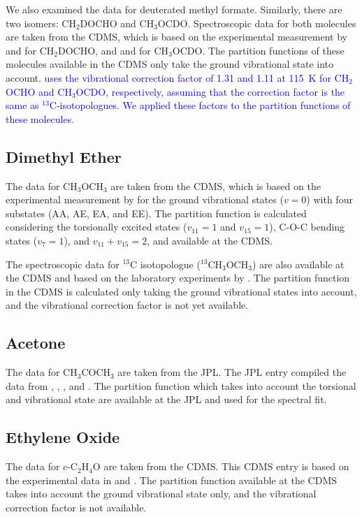 \documentclass[linenumbers, twocolumn, twocolappendix, astrosymb, times]{aastex631}
\newcommand{\dimethylether}{CH$_3$OCH$_3$\xspace}
\newcommand{\acetone}{CH$_3$COCH$_3$\xspace}
\newcommand{\ethyleneoxide}{$c$-C$_2$H$_4$O\xspace}
\begin{document}
We also examined the data for deuterated methyl formate. Similarly, there are two isomers: CH$_2$DOCHO and CH$_3$OCDO. Spectroscopic data for both molecules are taken from the CDMS, which is based on the experimental measurement by \citet{Coudert2013} and \citet{Margules2009} for CH$_2$DOCHO, and \citet{Margules2010} and \citet{Duan2015} for CH$_3$OCDO. The partition functions of these molecules available in the CDMS only take the ground vibrational state into account. 
\textcolor{blue}{\citet{Manigand2019} uses the vibrational correction factor of 1.31 and 1.11 at 115~K for CH$_2$OCHO and CH$_3$OCDO, respectively, assuming that the correction factor is the same as $^{13}$C-isotopologues. We applied these factors to the partition functions of these molecules.}


\subsection{Dimethyl Ether}
The data for \dimethylether are taken from the CDMS, which is based on the experimental measurement by \citet{Endres2009} for the ground vibrational states ($v = 0$) with four substates (AA, AE, EA, and EE). The partition function is calculated considering the torsionally excited states ($v_{11} = 1$ and $v_{15} = 1$), C-O-C bending states ($v_7 = 1$), and $v_{11} + v_{15} = 2$, and available at the CDMS. 

The spectroscopic data for $^{13}$C isotopologue ($^{13}$\dimethylether) are also available at the CDMS and based on the laboratory experiments by \citet{Koerber2013}. The partition function in the CDMS is calculated only taking the ground vibrational states into account, and the vibrational correction factor is not yet available.   

\subsection{Acetone}
The data for \acetone are taken from the JPL. The JPL entry compiled the data from \citet{Peter1965}, \citet{Vacherand1986}, \citet{Oldag1992}, and \citet{Groder2002}. The partition function which takes into account the torsional and vibrational state are available at the JPL and used for the spectral fit. 

\subsection{Ethylene Oxide}
The data for \ethyleneoxide are taken from the CDMS. This CDMS entry is based on the experimental data in \citet{Creswell1974} and \citet{Muller2022}. The partition function available at the CDMS takes into account the ground vibrational state only, and the vibrational correction factor is not available.
\end{document}
